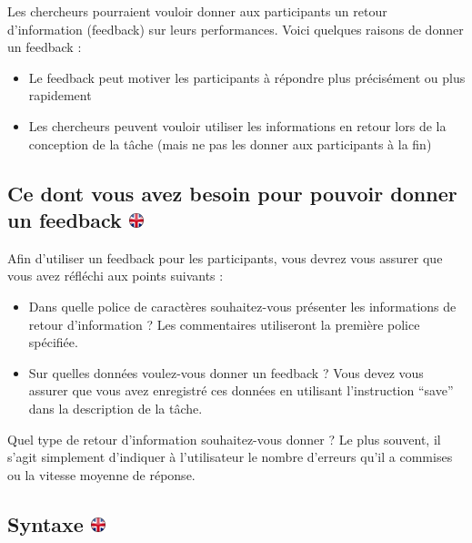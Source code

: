 \documentclass[
]{book}
\providecommand{\tightlist}{%
  \setlength{\itemsep}{0pt}\setlength{\parskip}{0pt}}
\begin{document}
Les chercheurs pourraient vouloir donner aux participants un retour
d'information (feedback) sur leurs performances. Voici quelques raisons
de donner un feedback :

\begin{itemize}
\tightlist
\item
  Le feedback peut motiver les participants à répondre plus précisément
  ou plus rapidement
\item
  Les chercheurs peuvent vouloir utiliser les informations en retour
  lors de la conception de la tâche (mais ne pas les donner aux
  participants à la fin)
\end{itemize}

\hypertarget{ce-dont-vous-avez-besoin-pour-pouvoir-donner-un-feedback}{%
\subsection[Ce dont vous avez besoin pour pouvoir donner un feedback
]{\texorpdfstring{Ce dont vous avez besoin pour pouvoir donner un
feedback
\href{https://www.psytoolkit.org/doc3.1.0/feedback.html\#_what_you_need_to_be_able_to_give_feedback}{\protect\includegraphics{img/ukflag.png}}}{Ce dont vous avez besoin pour pouvoir donner un feedback }}\label{ce-dont-vous-avez-besoin-pour-pouvoir-donner-un-feedback}}

Afin d'utiliser un feedback pour les participants, vous devrez vous
assurer que vous avez réfléchi aux points suivants :

\begin{itemize}
\tightlist
\item
  Dans quelle police de caractères souhaitez-vous présenter les
  informations de retour d'information ? Les commentaires utiliseront la
  première police spécifiée.
\item
  Sur quelles données voulez-vous donner un feedback ? Vous devez vous
  assurer que vous avez enregistré ces données en utilisant
  l'instruction ``save'' dans la description de la tâche.
\end{itemize}

Quel type de retour d'information souhaitez-vous donner ? Le plus
souvent, il s'agit simplement d'indiquer à l'utilisateur le nombre
d'erreurs qu'il a commises ou la vitesse moyenne de réponse.

\hypertarget{syntaxe}{%
\subsection[Syntaxe ]{\texorpdfstring{Syntaxe
\href{https://www.psytoolkit.org/doc3.1.0/feedback.html\#_syntax}{\protect\includegraphics{img/ukflag.png}}}{Syntaxe }}\label{syntaxe}}
\end{document}
